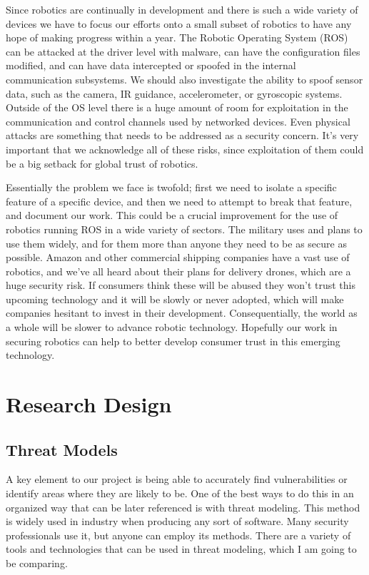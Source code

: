 \documentclass[IEEEtran,letterpaper,10pt,notitlepage,draftclsnofoot,onecolumn]{article}
\begin{document}
Since robotics are continually in development and there is such a wide variety of devices we have to focus our efforts onto a small subset of robotics to have any hope of making progress within a year. 
The Robotic Operating System (ROS) can be attacked at the driver level with malware, can have the configuration files modified, and can have data intercepted or spoofed in the internal communication subsystems.
We should also investigate the ability to spoof sensor data, such as the camera, IR guidance, accelerometer, or gyroscopic systems. 
Outside of the OS level there is a huge amount of room for exploitation in the communication and control channels used by networked devices. 
Even physical attacks are something that needs to be addressed as a security concern.
It's very important that we acknowledge all of these risks, since exploitation of them could be a big setback for global trust of robotics.

Essentially the problem we face is twofold; first we need to isolate a specific feature of a specific device, and then we need to attempt to break that feature, and document our work.
This could be a crucial improvement for the use of robotics running ROS in a wide variety of sectors.
The military uses and plans to use them widely, and for them more than anyone they need to be as secure as possible.
Amazon and other commercial shipping companies have a vast use of robotics, and we've all heard about their plans for delivery drones, which are a huge security risk.
If consumers think these will be abused they won't trust this upcoming technology and it will be slowly or never adopted, which will make companies hesitant to invest in their development.
Consequentially, the world as a whole will be slower to advance robotic technology.
Hopefully our work in securing robotics can help to better develop consumer trust in this emerging technology. 

\section{Research Design}
\subsection{Threat Models}
A key element to our project is being able to accurately find vulnerabilities or identify areas where they are likely to be. 
One of the best ways to do this in an organized way that can be later referenced is with threat modeling. 
This method is widely used in industry when producing any sort of software. Many security professionals use it, but anyone can employ its methods. 
There are a variety of tools and technologies that can be used in threat modeling, which I am going to be comparing.
\end{document}
